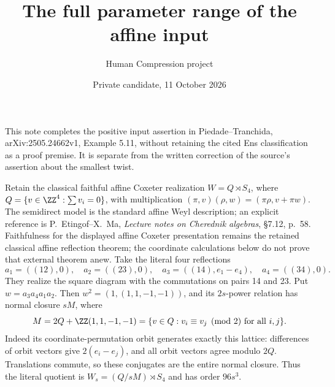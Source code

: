 
\title{The full parameter range of the affine input}
\author{Human Compression project}
\date{Private candidate, 11 October 2026}
\maketitle
This note completes the positive input assertion in Piedade--Tranchida,
arXiv:2505.24662v1, Example 5.11, without retaining the cited Ens
classification as a proof premise. It is separate from the written
correction of the source's assertion about the smallest twist.

Retain the classical faithful affine Coxeter realization
$W=Q\rtimes S_4$, where $Q=\{v\in\ZZ^4:\sum v_i=0\}$,
with multiplication $(\pi,v)(\rho,w)=(\pi\rho,v+\pi w)$.
The semidirect model is the standard affine Weyl description; an
explicit reference is P.~Etingof--X.~Ma, \emph{Lecture notes on
Cherednik algebras}, \S7.12, p.~58. Faithfulness for the displayed
affine Coxeter presentation remains the retained classical affine
reflection theorem; the coordinate calculations below do not prove
that external theorem anew.
Take the literal four reflections
\[
 a_1=((12),0),\quad a_2=((23),0),\quad
 a_3=((14),e_1-e_4),\quad a_4=((34),0).
\]
They realize the square diagram with the commutations on pairs 14
and 23. Put $w=a_3a_4a_1a_2$. Then
$w^2=(1,(1,1,-1,-1))$, and its $2s$-power relation has normal
closure $sM$, where
\[
 M=2Q+\ZZ(1,1,-1,-1)
  =\{v\in Q:v_i\equiv v_j\pmod2\text{ for all }i,j\}.
\]
Indeed its coordinate-permutation orbit generates exactly this lattice:
differences of orbit vectors give $2(e_i-e_j)$, and all orbit
vectors agree modulo $2Q$. Translations commute, so these conjugates
are the entire normal closure. Thus the literal quotient is
$W_s=(Q/sM)\rtimes S_4$ and has order $96s^3$.

